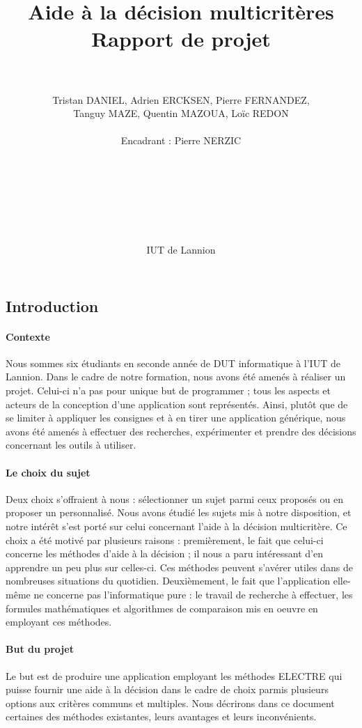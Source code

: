 \documentclass[a4paper]{article}
\title{Aide à la décision multicritères \\ Rapport de projet}
\author{\\\\ Tristan DANIEL, Adrien ERCKSEN, Pierre FERNANDEZ,\\ Tanguy MAZE, Quentin MAZOUA, Loïc REDON \\\\ Encadrant : Pierre NERZIC \\\\\\\\\\\\\\\\ IUT de Lannion}
\begin{document}
\maketitle

\newpage

\subsection*{Introduction}

\paragraph{Contexte}
Nous sommes six étudiants en seconde année de DUT informatique à l'IUT de Lannion. Dans le cadre de notre formation, nous avons été amenés à réaliser un projet. Celui-ci n'a pas pour unique but de programmer ; tous les aspects et acteurs de la conception d'une application sont représentés. Ainsi, plutôt que de se limiter à appliquer les consignes et à en tirer une application générique, nous avons été amenés à effectuer des recherches, expérimenter et prendre des décisions concernant les outils à utiliser.

\paragraph{Le choix du sujet}
Deux choix s'offraient à nous : sélectionner un sujet parmi ceux proposés ou en proposer un personnalisé. Nous avons étudié les sujets mis à notre disposition, et notre intérêt s'est porté sur celui concernant l'aide à la décision multicritère. Ce choix a été motivé par plusieurs raisons : premièrement, le fait que celui-ci concerne les méthodes d'aide à la décision ; il nous a paru intéressant d'en apprendre un peu plus sur celles-ci. Ces méthodes peuvent s'avérer utiles dans de nombreuses situations du quotidien. Deuxièmement, le fait que l'application elle-même ne concerne pas l'informatique pure : le travail de recherche à effectuer, les formules mathématiques et algorithmes de comparaison mis en oeuvre en employant ces méthodes.

\paragraph{But du projet}
Le but est de produire une application employant les méthodes ELECTRE qui puisse fournir une aide à la décision dans le cadre de choix parmis plusieurs options aux critères communs et multiples. Nous décrirons dans ce document certaines des méthodes existantes, leurs avantages et leurs inconvénients.
\end{document}
